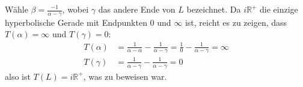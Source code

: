 \begin{solution}
\begin{itemize}
  Wähle \( \beta = \frac{-1}{\alpha - \gamma} \), wobei \( \gamma \) das andere Ende von \( L \) bezeichnet. Da \( i \mathbb{R}^{+} \) die einzige hyperbolische Gerade mit Endpunkten \( 0 \) und \( \infty \) ist, reicht es zu zeigen, dass \( T(\alpha) = \infty \) und \( T(\gamma) = 0 \): \\
  \begin{align*}
    T(\alpha) &= \frac{1}{\alpha - \alpha} - \frac{1}{\alpha - \gamma} = \frac{1}{0} - \frac{1}{\alpha - \gamma} = \infty \\
    T(\gamma) &= \frac{1}{\alpha - \gamma} - \frac{1}{\alpha - \gamma} = 0 
  \end{align*}
  also ist \( T(L) = i \mathbb{R}^{+} \), was zu beweisen war.
\end{itemize}
\end{solution}


